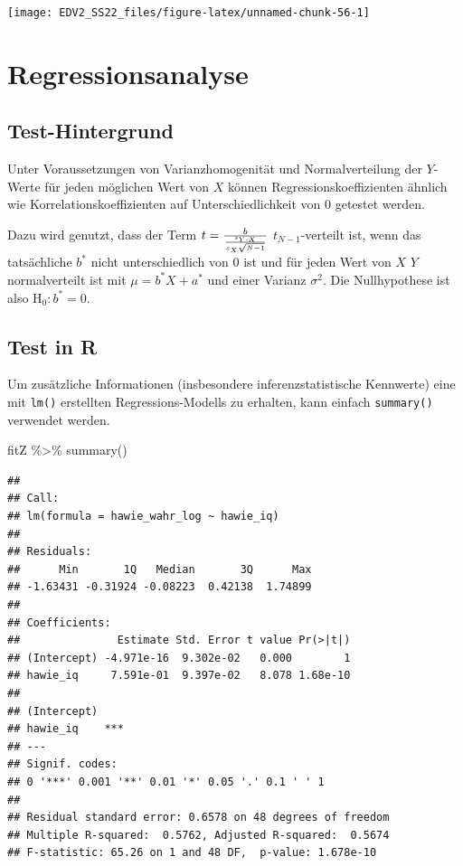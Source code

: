 \documentclass[
]{book}
\newenvironment{Shaded}{\begin{snugshade}}{\end{snugshade}}
\newcommand{\FunctionTok}[1]{\textcolor[rgb]{0.00,0.00,0.00}{#1}}
\newcommand{\NormalTok}[1]{#1}
\newcommand{\SpecialCharTok}[1]{\textcolor[rgb]{0.00,0.00,0.00}{#1}}
\begin{document}
\begin{center}\texttt{[image: EDV2\_SS22\_files/figure-latex/unnamed-chunk-56-1]} \end{center}

\hypertarget{regressionsanalyse}{%
\section{Regressionsanalyse}\label{regressionsanalyse}}

\hypertarget{test-hintergrund-1}{%
\subsection{Test-Hintergrund}\label{test-hintergrund-1}}

Unter Voraussetzungen von Varianzhomogenität und Normalverteilung der \(Y\)-Werte für jeden möglichen Wert von \(X\) können Regressionskoeffizienten ähnlich wie Korrelationskoeffizienten auf Unterschiedlichkeit von 0 getestet werden.

Dazu wird genutzt, dass der Term \(t = {{b}\over{{s_{Y \cdot X}}\over {s_X \sqrt{N-1}}}}\) \(t_{N-1}\)-verteilt ist, wenn das tatsächliche \(b^*\) nicht unterschiedlich von 0 ist und für jeden Wert von \(X\) \(Y\) normalverteilt ist mit \(\mu = b^*X + a^*\) und einer Varianz \(\sigma^2\). Die Nullhypothese ist also \(\text{H}_0: b^* = 0\).

\hypertarget{test-in-r}{%
\subsection{Test in R}\label{test-in-r}}

Um zusätzliche Informationen (insbesondere inferenzstatistische Kennwerte) eine mit \texttt{lm()} erstellten Regressions-Modells zu erhalten, kann einfach \texttt{summary()} verwendet werden.

\begin{Shaded}
\begin{Highlighting}[]
\NormalTok{fitZ }\SpecialCharTok{\%\textgreater{}\%} 
  \FunctionTok{summary}\NormalTok{()}
\end{Highlighting}
\end{Shaded}

\begin{verbatim}
## 
## Call:
## lm(formula = hawie_wahr_log ~ hawie_iq)
## 
## Residuals:
##      Min       1Q   Median       3Q      Max 
## -1.63431 -0.31924 -0.08223  0.42138  1.74899 
## 
## Coefficients:
##               Estimate Std. Error t value Pr(>|t|)
## (Intercept) -4.971e-16  9.302e-02   0.000        1
## hawie_iq     7.591e-01  9.397e-02   8.078 1.68e-10
##                
## (Intercept)    
## hawie_iq    ***
## ---
## Signif. codes:  
## 0 '***' 0.001 '**' 0.01 '*' 0.05 '.' 0.1 ' ' 1
## 
## Residual standard error: 0.6578 on 48 degrees of freedom
## Multiple R-squared:  0.5762, Adjusted R-squared:  0.5674 
## F-statistic: 65.26 on 1 and 48 DF,  p-value: 1.678e-10
\end{verbatim}
\end{document}
